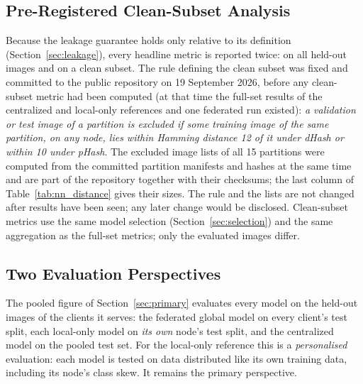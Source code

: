 \documentclass[journal]{IEEEtran}
\begin{document}
\subsection{Pre-Registered Clean-Subset Analysis}
\label{sec:clean}

Because the leakage guarantee holds only relative to its definition (Section~\ref{sec:leakage}), every headline metric is reported twice: on all held-out images and on a clean subset. The rule defining the clean subset was fixed and committed to the public repository on 19 September 2026, before any clean-subset metric had been computed (at that time the full-set results of the centralized and local-only references and one federated run existed): \emph{a validation or test image of a partition is excluded if some training image of the same partition, on any node, lies within Hamming distance 12 of it under dHash or within 10 under pHash}. The excluded image lists of all 15 partitions were computed from the committed partition manifests and hashes at the same time and are part of the repository together with their checksums; the last column of Table~\ref{tab:nn_distance} gives their sizes. The rule and the lists are not changed after results have been seen; any later change would be disclosed. Clean-subset metrics use the same model selection (Section~\ref{sec:selection}) and the same aggregation as the full-set metrics; only the evaluated images differ.

\subsection{Two Evaluation Perspectives}
\label{sec:perspectives}

The pooled figure of Section~\ref{sec:primary} evaluates every model on the held-out images of the clients it serves: the federated global model on every client's test split, each local-only model on \emph{its own} node's test split, and the centralized model on the pooled test set. For the local-only reference this is a \emph{personalised} evaluation: each model is tested on data distributed like its own training data, including its node's class skew. It remains the primary perspective.
\end{document}
